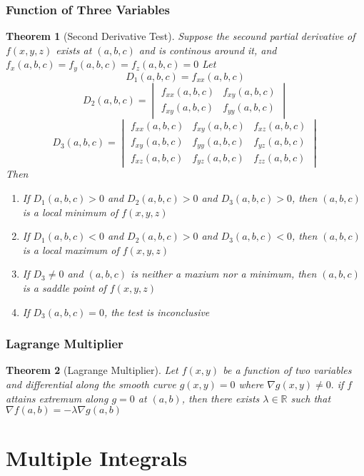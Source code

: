 \documentclass[9pt]{article}
\newtheorem{theorem}{Theorem}[subsection]
\theoremstyle{definition}
\theoremstyle{remark}
\begin{document}
\subsubsection{Function of Three Variables}
\begin{theorem}[Second Derivative Test]
Suppose the secound partial derivative of $f(x,y,z)$ exists at $(a,b,c)$ and is continous around it, and $f_x(a,b,c)=f_y(a,b,c)=f_z(a,b,c) = 0$
Let 
\[
	D_1(a, b, c) = f_{xx}(a,b,c)
\]
\[
	D_2(a, b, c) = \begin{vmatrix} f_{xx}(a,b,c) & f_{xy}(a,b,c) \\ f_{xy}(a,b,c) & f_{yy}(a,b,c) \end{vmatrix}
\]
\[
	D_3(a, b, c) = \begin{vmatrix} f_{xx}(a,b,c) & f_{xy}(a,b,c) & f_{xz}(a,b,c) \\ f_{xy}(a,b,c) & f_{yy}(a,b,c) & f_{yz}(a,b,c) \\ f_{xz}(a,b,c) & f_{yz}(a,b,c) & f_{zz}(a,b,c) \end{vmatrix}
\]
Then 
\begin{enumerate}
	\item If $D_1(a,b,c) > 0$ and $D_2(a,b,c) > 0$ and $D_3(a,b,c) > 0$, then $(a,b,c)$ is a local minimum of $f(x,y,z)$
	\item If $D_1(a,b,c) < 0$ and $D_2(a,b,c) > 0$ and $D_3(a,b,c) < 0$, then $(a,b,c)$ is a local maximum of $f(x,y,z)$
	\item If $D_3 \neq 0$ and $(a,b,c)$ is neither a maxium nor a minimum, then $(a,b,c)$ is a saddle point of $f(x,y,z)$
	\item If $D_3(a,b,c) = 0$, the test is inconclusive

\end{enumerate}
\end{theorem}
\subsubsection{Lagrange Multiplier}

\begin{theorem}[Lagrange Multiplier]
	Let $f(x,y)$ be a function of two variables and differential along the smooth curve $g(x,y) = 0$ where $\nabla g (x,y) \neq 0.$ 
	if $f$ attains extremum along $g = 0$ at $(a,b)$, then there exists $\lambda \in \mathbb{R}$ such that
	$
		\nabla f (a,b)= - \lambda \nabla g(a, b)
	$
\end{theorem}
\section{Multiple Integrals}
\end{document}
